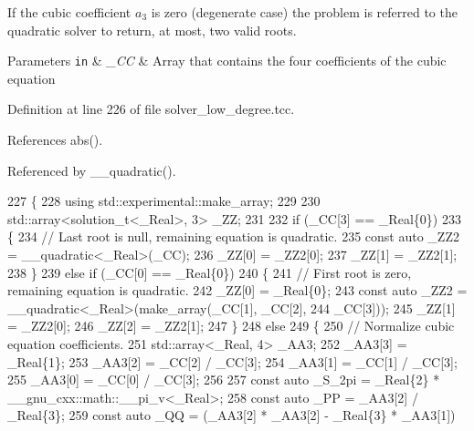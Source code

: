 If the cubic coefficient $ a_3 $ is zero (degenerate case) the problem is referred to the quadratic solver to return, at most, two valid roots.


\begin{DoxyParams}[1]{Parameters}
\mbox{\tt in}  & {\em \+\_\+\+CC} & Array that contains the four coefficients of the cubic equation \\
\hline
\end{DoxyParams}


Definition at line 226 of file solver\+\_\+low\+\_\+degree.\+tcc.



References abs().



Referenced by \+\_\+\+\_\+quadratic().


\begin{DoxyCode}
227     \{
228       \textcolor{keyword}{using} std::experimental::make\_array;
229 
230       std::array<solution\_t<\_Real>, 3> \_ZZ;
231 
232       \textcolor{keywordflow}{if} (\_CC[3] == \_Real\{0\})
233         \{
234           \textcolor{comment}{// Last root is null, remaining equation is quadratic.}
235           \textcolor{keyword}{const} \textcolor{keyword}{auto} \_ZZ2 = \_\_quadratic<\_Real>(\_CC);
236           \_ZZ[0] = \_ZZ2[0];
237           \_ZZ[1] = \_ZZ2[1];
238         \}
239       \textcolor{keywordflow}{else} \textcolor{keywordflow}{if} (\_CC[0] == \_Real\{0\})
240         \{
241           \textcolor{comment}{// First root is zero, remaining equation is quadratic.}
242           \_ZZ[0] = \_Real\{0\};
243           \textcolor{keyword}{const} \textcolor{keyword}{auto} \_ZZ2 = \_\_quadratic<\_Real>(make\_array(\_CC[1], \_CC[2],
244                                                           \_CC[3]));
245           \_ZZ[1] = \_ZZ2[0];
246           \_ZZ[2] = \_ZZ2[1];
247         \}
248       \textcolor{keywordflow}{else}
249         \{
250           \textcolor{comment}{// Normalize cubic equation coefficients.}
251           std::array<\_Real, 4> \_AA3;
252           \_AA3[3] = \_Real\{1\};
253           \_AA3[2] = \_CC[2] / \_CC[3];
254           \_AA3[1] = \_CC[1] / \_CC[3];
255           \_AA3[0] = \_CC[0] / \_CC[3];
256 
257           \textcolor{keyword}{const} \textcolor{keyword}{auto} \_S\_2pi = \_Real\{2\} * \_\_gnu\_cxx::math::\_\_pi\_v<\_Real>;
258           \textcolor{keyword}{const} \textcolor{keyword}{auto} \_PP = \_AA3[2] / \_Real\{3\};
259           \textcolor{keyword}{const} \textcolor{keyword}{auto} \_QQ = (\_AA3[2] * \_AA3[2] - \_Real\{3\} * \_AA3[1])

\end{DoxyCode}

